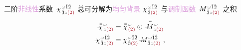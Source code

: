 二阶\textcolor{Plum}{非线性}系数 $\xint{{}^{}_{\mathcolor{gray}{-}}}{23}{\chi}^{\;\! \mathcolor{gray}{\omega} \hat{1} \hat{2} }_{\;\! \hat{3} \mathcolor{gray}{z} \textcolor{Maroon}{(2)} }$ 总可分解为\textcolor{Plum}{均匀背景} ${\chi}^{\;\! \mathcolor{gray}{\omega} \hat{1} \hat{2} }_{\;\! \hat{3} \textcolor{Maroon}{(2)} }$ 与\textcolor{Plum}{调制函数} $\xint{\mathcolor{gray}{-}}{18}{M}^{\;\! \mathcolor{gray}{\omega} \hat{1} \hat{2} }_{\;\! \hat{3} \mathcolor{gray}{z} \textcolor{Maroon}{(2)} }$ 之积
\begin{subequations} \label{eq:chi2-modulate}
\begin{align}
	\xint{{}^{}_{\mathcolor{gray}{-}}}{23}{\bar{\bar{\bar{\chi}}}} ^{\;\! \mathcolor{gray}{\omega} } _{\;\! \mathcolor{gray}{z} \textcolor{Maroon}{(2)} } &= \bar{\bar{\bar{\chi}}}^{\;\! \mathcolor{gray}{\omega} }_{\;\! \textcolor{Maroon}{(2)} } \odot \xint{\mathcolor{gray}{-}}{18}{\bar{\bar{\bar{M}}}}^{\;\! \mathcolor{gray}{\omega} }_{\;\! \mathcolor{gray}{z} \textcolor{Maroon}{(2)} } \label{eq:vec-chi2-modulate} \\
	\xint{{}^{}_{\mathcolor{gray}{-}}}{23}{\chi}^{\;\! \mathcolor{gray}{\omega} \hat{1} \hat{2} }_{\;\! \hat{3} \mathcolor{gray}{z} \textcolor{Maroon}{(2)} } &= {\chi}^{\;\! \mathcolor{gray}{\omega} \hat{1} \hat{2} }_{\;\! \hat{3} \textcolor{Maroon}{(2)} } \xint{\mathcolor{gray}{-}}{18}{M}^{\;\! \mathcolor{gray}{\omega} \hat{1} \hat{2} }_{\;\! \hat{3} \mathcolor{gray}{z} \textcolor{Maroon}{(2)} } ~, \label{eq:components-chi2-modulate}
\end{align}
\end{subequations}
